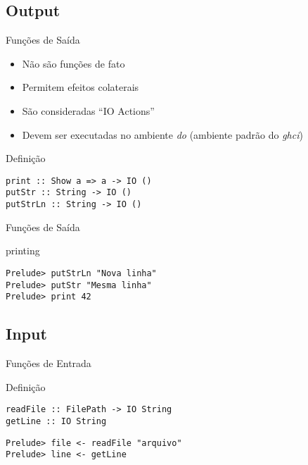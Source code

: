 \documentclass{beamer}
\begin{document}
		\subsection{Output}
		\begin{frame}[fragile]{Funções de Saída}
		 \begin{itemize}
		  \item Não são funções de fato
		  \item Permitem efeitos colaterais
		  \item São consideradas ``IO Actions''
		  \item Devem ser executadas no ambiente \textit{do} (ambiente padrão do \textit{ghci})
		 \end{itemize}
		 
		 \begin{block}{Definição}
		  \begin{lstlisting}
print :: Show a => a -> IO ()
putStr :: String -> IO ()
putStrLn :: String -> IO ()
		  \end{lstlisting}
		 \end{block}
		\end{frame}
		
		\begin{frame}[fragile]{Funções de Saída}
		 \begin{block}{printing}
		  \begin{lstlisting}
Prelude> putStrLn "Nova linha"
Prelude> putStr "Mesma linha"
Prelude> print 42
		  \end{lstlisting}
		 \end{block}
		\end{frame}
		
		\subsection{Input}
		\begin{frame}[fragile]{Funções de Entrada}

		 \begin{block}{Definição}
		  \begin{lstlisting}
readFile :: FilePath -> IO String
getLine :: IO String
		  \end{lstlisting}
		 \end{block}
		 
		 \begin{block}{}
		  \begin{lstlisting}
Prelude> file <- readFile "arquivo"
Prelude> line <- getLine
		  \end{lstlisting}
		 \end{block}		 
		\end{frame}
\end{document}
